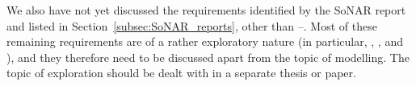 We also have not yet discussed the requirements identified by the SoNAR report
and listed in Section~\ref{subsec:SoNAR_reports},
other than --.
Most of these remaining requirements are of a rather exploratory nature
(in particular, , , and ),
and they therefore need to be discussed apart from the topic of modelling.
The topic of exploration should be dealt with in a separate
thesis or paper.


